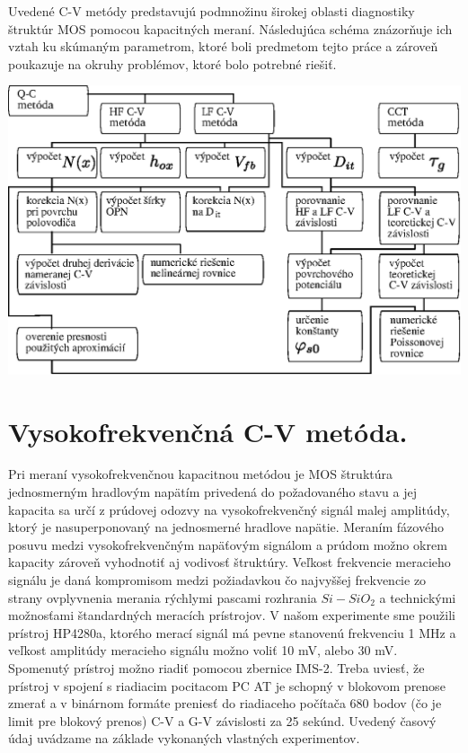 Uvedené C-V metódy predstavujú podmnožinu širokej oblasti diagnostiky
štruktúr MOS pomocou kapacitných meraní.  Následujúca schéma
znázorňuje ich vztah ku skúmaným parametrom, ktoré boli predmetom
tejto práce a zároveň poukazuje na okruhy problémov, ktoré bolo
potrebné riešiť.

\begin{diagram}
  \centering
  \includegraphics[width=\textwidth,height=\textheight,scale=0.7,keepaspectratio]{Figures/diagram-1.EPS}\label{diagram:1}
\end{diagram}

\section{Vysokofrekvenčná C-V metóda.}\label{sec:3.1}

Pri meraní vysokofrekvenčnou kapacitnou metódou je MOS štruktúra
jednosmerným hradlovým napätím privedená do požadovaného stavu a jej
kapacita sa určí z prúdovej odozvy na vysokofrekvenčný signál malej
amplitúdy, ktorý je nasuperponovaný na jednosmerné hradlove
napätie. Meraním fázového posuvu medzi vysokofrekvenčným napäťovým
signálom a prúdom možno okrem kapacity zároveň vyhodnotiť aj vodivosť
štruktúry. Veľkost frekvencie meracieho signálu je daná kompromisom
medzi požiadavkou čo najvyššej frekvencie zo strany ovplyvnenia
merania rýchlymi pascami rozhrania $Si-SiO_2$ a technickými možnosťami
štandardných meracích prístrojov.  V našom experimente sme použili
prístroj HP4280a, ktorého merací signál má pevne stanovenú frekvenciu
1 MHz a veľkost amplitúdy meracieho signálu možno voliť 10 mV, alebo
30 mV.  Spomenutý prístroj možno riadiť pomocou zbernice IMS-2. Treba
uviesť, že prístroj v spojení s riadiacim pocitacom PC AT je schopný v
blokovom prenose zmerať a v binárnom formáte preniesť do riadiaceho
počítača 680 bodov (čo je limit pre blokový prenos) C-V a G-V
závislosti za 25 sekúnd.  Uvedený časový údaj uvádzame na základe
vykonaných vlastných experimentov.

